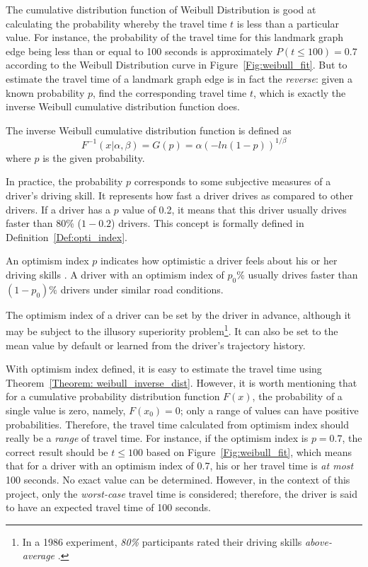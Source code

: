 The cumulative distribution function of Weibull Distribution is good at calculating the probability whereby the travel time $t$ is less than a particular value. For instance, the probability of the travel time for this landmark graph edge being less than or equal to 100 seconds is approximately $P(t\leq100) = 0.7$ according to the Weibull Distribution curve in Figure~\ref{Fig:weibull_fit}. But to estimate the travel time of a landmark graph edge is in fact the \emph{reverse}: given a known probability $p$, find the corresponding travel time $t$, which is exactly the inverse Weibull cumulative distribution function does. 

\begin{theorem}\label{Theorem: weibull_inverse_dist}
The inverse Weibull cumulative distribution function is defined as
\begin{equation}
F^{-1}(x | \alpha, \beta) = G(p) = \alpha(-ln(1 - p)) ^ {1/\beta}
\end{equation}
where $p$ is the given probability.
\end{theorem}

In practice, the probability $p$ corresponds to some subjective measures of a driver's driving skill. It represents how fast a driver drives as compared to other drivers. If a driver has a $p$ value of 0.2, it means that this driver usually drives faster than 80\% ($1 - 0.2$) drivers. This concept is formally defined in Definition~\ref{Def:opti_index}.

\begin{defn}\label{Def:opti_index}
An optimism index $p$ indicates how optimistic a driver feels about his or her driving skills \cite{TDR10}. A driver with an optimism index of $p_{0}\%$ usually drives faster than $(1 - p_{0})\%$ drivers under similar road conditions.
\end{defn}

The optimism index of a driver can be set by the driver in advance, although it may be subject to the illusory superiority problem\footnote{In a 1986 experiment, \emph{80\%} participants rated their driving skills \emph{above-average} \cite{IFD86}.}. It can also be set to the mean value by default or learned from the driver's trajectory history. 

With optimism index defined, it is easy to estimate the travel time using Theorem~\ref{Theorem: weibull_inverse_dist}. However, it is worth mentioning that for a cumulative probability distribution function $F(x)$, the probability of a single value is zero, namely, $F(x_{0}) = 0$; only a range of values can have positive probabilities. Therefore, the travel time calculated from optimism index should really be a \emph{range} of travel time. For instance, if the optimism index is $p = 0.7$, the correct result should be $t \leq 100$ based on Figure~\ref{Fig:weibull_fit}, which means that for a driver with an optimism index of 0.7, his or her travel time is \emph{at most} 100 seconds. No exact value can be determined. However, in the context of this project, only the \emph{worst-case} travel time is considered; therefore, the driver is said to have an expected travel time of 100 seconds. 

